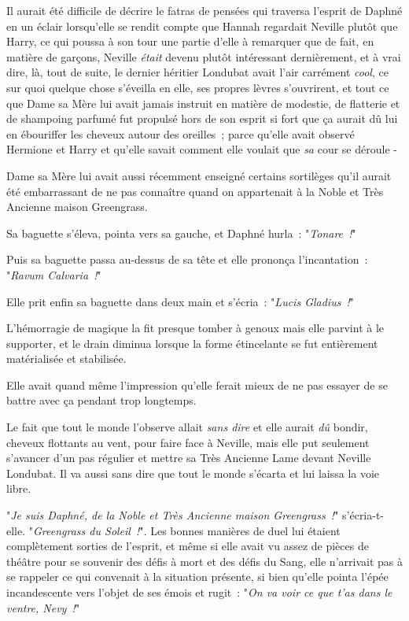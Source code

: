 Il aurait été difficile de décrire le fatras de pensées qui traversa l'esprit de Daphné en un éclair lorsqu'elle se rendit compte que Hannah regardait Neville plutôt que Harry, ce qui poussa à son tour une partie d'elle à remarquer que de fait, en matière de garçons, Neville \emph{était} devenu plutôt intéressant dernièrement, et à vrai dire, là, tout de suite, le dernier héritier Londubat avait l'air carrément \emph{cool}, ce sur quoi quelque chose s'éveilla en elle, ses propres lèvres s'ouvrirent, et tout ce que Dame sa Mère lui avait jamais instruit en matière de modestie, de flatterie et de shampoing parfumé fut propulsé hors de son esprit si fort que ça aurait dû lui en ébouriffer les cheveux autour des oreilles~; parce qu'elle avait observé Hermione et Harry et qu'elle savait comment elle voulait que \emph{sa} cour se déroule -

Dame sa Mère lui avait aussi récemment enseigné certains sortilèges qu'il aurait été embarrassant de ne pas connaître quand on appartenait à la Noble et Très Ancienne maison Greengrass.

Sa baguette s'éleva, pointa vers sa gauche, et Daphné hurla~: "\emph{Tonare~!}"

Puis sa baguette passa au-dessus de sa tête et elle prononça l'incantation~: "\emph{Ravum Calvaria~!}"

Elle prit enfin sa baguette dans deux main et s'écria~: "\emph{Lucis Gladius~!}"

L'hémorragie de magique la fit presque tomber à genoux mais elle parvint à le supporter, et le drain diminua lorsque la forme étincelante se fut entièrement matérialisée et stabilisée.

Elle avait quand même l'impression qu'elle ferait mieux de ne pas essayer de se battre avec ça pendant trop longtemps.

Le fait que tout le monde l'observe allait \emph{sans dire} et elle aurait \emph{dû} bondir, cheveux flottants au vent, pour faire face à Neville, mais elle put seulement s'avancer d'un pas régulier et mettre sa Très Ancienne Lame devant Neville Londubat. Il va aussi sans dire que tout le monde s'écarta et lui laissa la voie libre.

"\emph{Je suis Daphné, de la Noble et Très Ancienne maison Greengrass~!}" s'écria-t-elle. "\emph{Greengrass du Soleil~!}". Les bonnes manières de duel lui étaient complètement sorties de l'esprit, et même si elle avait vu assez de pièces de théâtre pour se souvenir des défis à mort et des défis du Sang, elle n'arrivait pas à se rappeler ce qui convenait à la situation présente, si bien qu'elle pointa l'épée incandescente vers l'objet de ses émois et rugit~: "\emph{On va voir ce que t'as dans le ventre, Nevy~!}"

